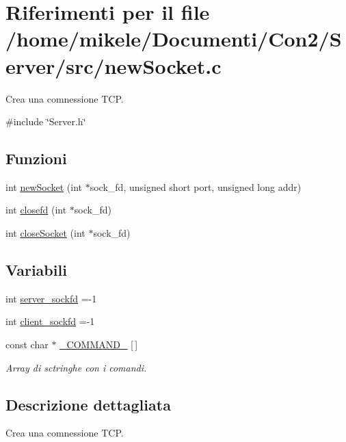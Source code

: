 \hypertarget{a00038}{}\section{Riferimenti per il file /home/mikele/\+Documenti/\+Con2/\+Server/src/new\+Socket.c}
\label{a00038}


Crea una comnessione T\+CP.  


{\ttfamily \#include \char`\"{}Server.\+h\char`\"{}}\newline
\subsection*{Funzioni}
\begin{DoxyCompactItemize}
\item 
int \mbox{\hyperlink{a00038_aa205d529430076c7724f2c72f12dcb38}{new\+Socket}} (int $\ast$sock\+\_\+fd, unsigned short port, unsigned long addr)
\item 
int \mbox{\hyperlink{a00038_a8a79b768546e3245c4532cdff6d2f79b}{closefd}} (int $\ast$sock\+\_\+fd)
\item 
int \mbox{\hyperlink{a00038_af70e50a14325b2c9736260cce00d7bdf}{close\+Socket}} (int $\ast$sock\+\_\+fd)
\end{DoxyCompactItemize}
\subsection*{Variabili}
\begin{DoxyCompactItemize}
\item 
int \mbox{\hyperlink{a00038_a2ccfb2765eac8b4d979cdd448e39e7cb}{server\+\_\+sockfd}} =-\/1
\item 
int \mbox{\hyperlink{a00038_adcd79dabf165c46577baa01e0a363078}{client\+\_\+sockfd}} =-\/1
\item 
const char $\ast$ \mbox{\hyperlink{a00038_abffef7bafd413aaa6ac4a8890404e461}{\+\_\+\+C\+O\+M\+M\+A\+N\+D\+\_\+}} \mbox{[}$\,$\mbox{]}
\begin{DoxyCompactList}\small\item\em Array di sctringhe con i comandi. \end{DoxyCompactList}\end{DoxyCompactItemize}


\subsection{Descrizione dettagliata}
Crea una comnessione T\+CP. 

